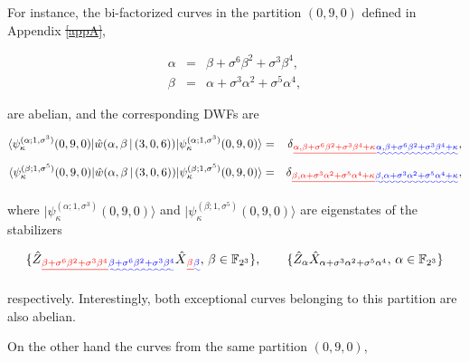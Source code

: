 \documentclass[quantumrep,article,submit,pdftex,moreauthors]{Definitions/mdpi}
\providecommand{\DIFadd}[1]{{\protect\color{blue}\uwave{#1}}} %
\providecommand{\DIFdel}[1]{{\protect\color{red}\sout{#1}}}                      %
\providecommand{\DIFaddbegin}{} %
\providecommand{\DIFaddend}{} %
\providecommand{\DIFdelbegin}{} %
\providecommand{\DIFdelend}{} %
\begin{document}
For instance, the bi-factorized curves in the partition $(0,9,0)$ defined in
Appendix \DIFdelbegin \DIFdel{\ref{appA}}\DIFdelend \DIFaddbegin \DIFadd{\ref{appB}}\DIFaddend ,

\begin{eqnarray}
  \alpha
  &=& \beta + \sigma^{6} \beta^{2} + \sigma^{3}\beta^{4},
  \label{ac1} \\
  \beta
  &=& \alpha + \sigma^{3} \alpha^{2} + \sigma^{5}\alpha^{4},
  \label{ac2}
\end{eqnarray}

are abelian, and the corresponding DWFs are

\begin{eqnarray}
  \langle \psi_{\kappa}^{(\alpha ; 1,\sigma^{3})}(0,9,0)
  |\hat{w}\left(\alpha,\beta \, | \, (3,0,6)\right)
  |\psi_{\kappa}^{(\alpha ; 1,\sigma^{3})}(0,9,0)\rangle
  &=& \delta\DIFdelbegin \DIFdel{_{\alpha,\beta + \sigma^{6}\beta^{2} + \sigma^{3} \beta^{4} +
  \kappa}}\DIFdelend \DIFaddbegin \DIFadd{_{\alpha, \beta + \sigma^{6}\beta^{2} + \sigma^{3} \beta^{4} + \kappa}}\DIFaddend , \\
  \langle \psi_{\kappa }^{(\beta ; 1,\sigma^{5})}(0,9,0)
  |\hat{w}\left(\alpha,\beta \, | \, (3,0,6)\right)
  |\psi_{\kappa}^{(\beta ; 1,\sigma^{5})}(0,9,0)\rangle
  &=& \delta\DIFdelbegin \DIFdel{_{\beta,\alpha + \sigma^{3}\alpha^{2} + \sigma^{5} \alpha^{4} +
  \kappa }}\DIFdelend \DIFaddbegin \DIFadd{_{\beta,\alpha + \sigma^{3}\alpha^{2} + \sigma^{5} \alpha^{4} + \kappa}}\DIFaddend ,
  \label{ac2 delta}
\end{eqnarray}

where $|\psi_{\kappa}^{(\alpha ; 1,\sigma^{3})}(0,9,0)\rangle$ and
$|\psi_{\kappa }^{(\beta ; 1,\sigma^{5})}(0,9,0)\rangle$ are eigenstates of the
stabilizers

\begin{equation*}
  \{\hat{Z}\DIFdelbegin \DIFdel{_{\beta +\sigma ^{6}\beta ^{2}+\sigma^{3}\beta^{4}}
}\DIFdelend \DIFaddbegin \DIFadd{_{\beta + \sigma^{6}\beta ^{2}+\sigma^{3}\beta^{4}} }\DIFaddend \hat{X}\DIFdelbegin \DIFdel{_{\beta }}\DIFdelend \DIFaddbegin \DIFadd{_{\beta}}\DIFaddend ,
  \, \beta \in \mathbb{F}_{2^{3}}\},
  \qquad \{\hat{Z}_{\alpha } \hat{X}_{\alpha + \sigma^{3}\alpha^{2} + \sigma^{5}\alpha^{4}},
  \, \alpha \in \mathbb{F}_{2^{3}}\}
\end{equation*}

respectively. Interestingly, both exceptional curves belonging to this partition
are also abelian.

On the other hand the curves from the same partition $(0,9,0)$,
\end{document}
